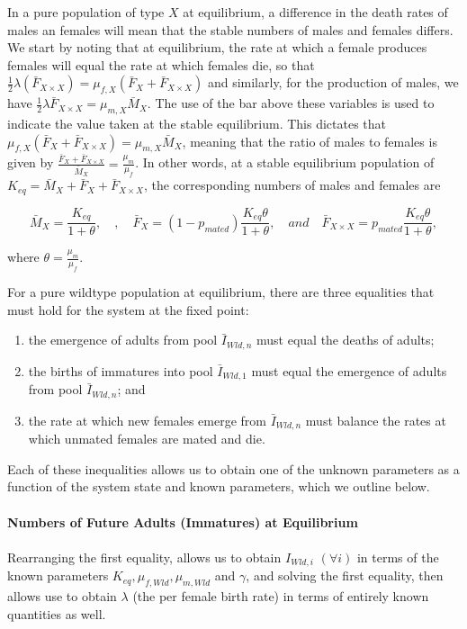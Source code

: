 \documentclass[]{article}  %
\begin{document}
In a pure population of type $X$ at equilibrium, a difference in the death rates of males an females will mean that the stable numbers of males and females differs.  We start by noting that at equilibrium, the rate at which a female produces females will equal the rate at which females die, so that $\tfrac{1}{2}\lambda (\bar{F}_{X \times X}) = \mu_{f,X} (\bar{F}_{X} + \bar{F}_{X \times X})$ and similarly, for the production of males, we have $\tfrac{1}{2}\lambda \bar{F}_{X \times X} = \mu_{m, X} \bar{M}_{X}$.  The use of the bar above these variables is used to indicate the value taken at the stable equilibrium.  This dictates that $\mu_{f, X} (\bar{F}_{X} + \bar{F}_{X \times X}) =  \mu_{m, X} \bar{M}_{X}$, meaning that the ratio of males to females is given by $\tfrac{\bar{F}_{X} + \bar{F}_{X \times X} }{\bar{M}_{X} } = \tfrac{\mu_m}{\mu_f}$. In other words, at a stable equilibrium population of $K_{eq} = \bar{M}_{X} + \bar{F}_{X} + \bar{F}_{X \times X}$, the corresponding numbers of males and females are

$$ \bar{M}_{X} = \frac{K_{eq}}{1 + \theta}, \quad, \quad \bar{F}_{X} = (1 - p_{mated})\frac{K_{eq} \theta}{1 + \theta}, \quad and \quad \bar{F}_{X \times X} = p_{mated}\frac{K_{eq} \theta}{1 + \theta}, $$

\noindent where $\theta = \tfrac{\mu_m}{\mu_f}$.

For a pure wildtype population at equilibrium, there are three equalities that must hold for the system at the fixed point: 
\begin{enumerate}
\item the emergence of adults from pool $\bar{I}_{Wld, n}$ must equal the deaths of adults;
\item the births of immatures into pool $\bar{I}_{Wld, 1}$ must equal the emergence of adults from pool $\bar{I}_{Wld, n}$; and
\item the rate at which new females emerge from $\bar{I}_{Wld, n}$ must balance the rates at which unmated females are mated and die.
\end{enumerate}

\noindent Each of these inequalities allows us to obtain one of the unknown parameters as a function of the system state and known parameters, which we outline below.
\\
\\
{\bf Numbers of Future Adults (Immatures) at Equilibrium}
\\
\\
\noindent Rearranging the first equality, allows us to obtain $I_{Wld, i}$ $(\forall i)$ in terms of the known parameters $K_{eq}, \mu_{f, Wld}, \mu_{m, Wld}$ and $\gamma$, and solving the first equality, then allows use to obtain $\lambda$ (the per female birth rate) in terms of entirely known quantities as well.
\end{document}
